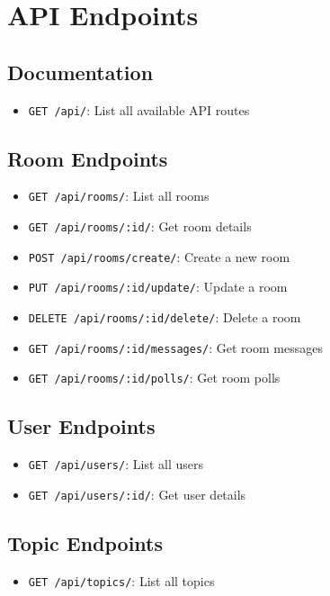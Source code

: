 \documentclass[11pt]{article}
\begin{document}
\section{API Endpoints}

\subsection{Documentation}
\begin{itemize}
  \item \texttt{GET /api/}: List all available API routes
\end{itemize}

\subsection{Room Endpoints}
\begin{itemize}
  \item \texttt{GET /api/rooms/}: List all rooms
  \item \texttt{GET /api/rooms/:id/}: Get room details
  \item \texttt{POST /api/rooms/create/}: Create a new room
  \item \texttt{PUT /api/rooms/:id/update/}: Update a room
  \item \texttt{DELETE /api/rooms/:id/delete/}: Delete a room
  \item \texttt{GET /api/rooms/:id/messages/}: Get room messages
  \item \texttt{GET /api/rooms/:id/polls/}: Get room polls
\end{itemize}

\subsection{User Endpoints}
\begin{itemize}
  \item \texttt{GET /api/users/}: List all users
  \item \texttt{GET /api/users/:id/}: Get user details
\end{itemize}

\subsection{Topic Endpoints}
\begin{itemize}
  \item \texttt{GET /api/topics/}: List all topics
\end{itemize}
\end{document}
